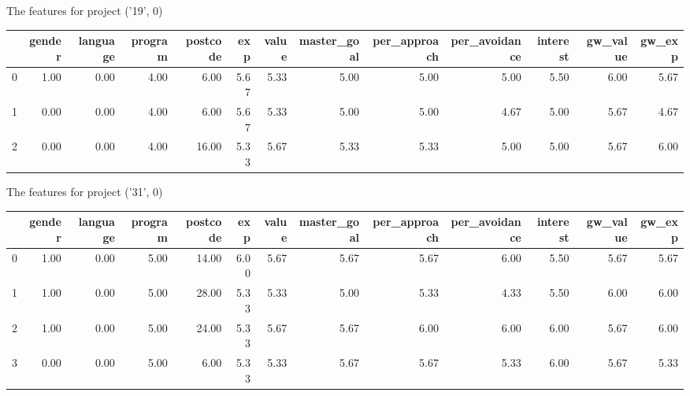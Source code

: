 \documentclass[7pt]{article}
\begin{document}
\begin{landscape}
The features for project ('19', 0)\newline
\begin{tabular}{lrrrrrrrrrrrr}
\toprule
{} &  gender &  language &  program &  postcode &  exp &  value &  master\_goal &  per\_approach &  per\_avoidance &  interest &  gw\_value &  gw\_exp \\
\midrule
0 &    1.00 &      0.00 &     4.00 &      6.00 & 5.67 &   5.33 &         5.00 &          5.00 &           5.00 &      5.50 &             6.00 &           5.67 \\
1 &    0.00 &      0.00 &     4.00 &      6.00 & 5.67 &   5.33 &         5.00 &          5.00 &           4.67 &      5.00 &             5.67 &           4.67 \\
2 &    0.00 &      0.00 &     4.00 &     16.00 & 5.33 &   5.67 &         5.33 &          5.33 &           5.00 &      5.00 &             5.67 &           6.00 \\
\bottomrule
\end{tabular}

The features for project ('31', 0)\newline
\begin{tabular}{lrrrrrrrrrrrr}
\toprule
{} &  gender &  language &  program &  postcode &  exp &  value &  master\_goal &  per\_approach &  per\_avoidance &  interest &  gw\_value &  gw\_exp \\
\midrule
0 &    1.00 &      0.00 &     5.00 &     14.00 & 6.00 &   5.67 &         5.67 &          5.67 &           6.00 &      5.50 &             5.67 &           5.67 \\
1 &    1.00 &      0.00 &     5.00 &     28.00 & 5.33 &   5.33 &         5.00 &          5.33 &           4.33 &      5.50 &             6.00 &           6.00 \\
2 &    1.00 &      0.00 &     5.00 &     24.00 & 5.33 &   5.67 &         5.67 &          6.00 &           6.00 &      6.00 &             5.67 &           6.00 \\
3 &    0.00 &      0.00 &     5.00 &      6.00 & 5.33 &   5.33 &         5.67 &          5.67 &           5.33 &      6.00 &             5.67 &           5.33 \\
\bottomrule
\end{tabular}


\end{landscape}
\end{document}

